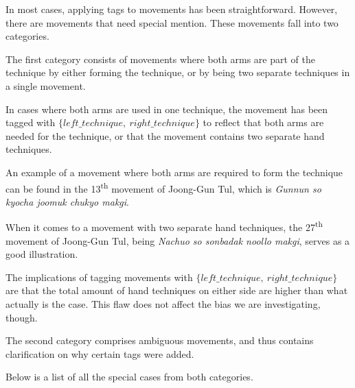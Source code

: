 \documentclass[10pt,twocolumn,a4paper]{article}
\begin{document}
  In most cases, applying tags to movements has been straightforward.
  However, there are movements that need special mention. These movements fall
  into two categories.

  The first category consists of movements where both arms are part of the
  technique by either forming the technique, or by being two separate
  techniques in a single movement.

  In cases where both arms are used in one technique, the movement has been
  tagged with $\{left\_technique, \: right\_technique\}$ to reflect that both
  arms are needed for the technique, or that the movement contains two
  separate hand techniques.

  An example of a movement where both arms are required to form the technique
  can be found in the 13\textsuperscript{th} movement of Joong-Gun Tul, which
  is \emph{Gunnun so kyocha joomuk chukyo makgi}.

  When it comes to a movement with two separate hand techniques, the
  27\textsuperscript{th} movement of Joong-Gun Tul, being \emph{Nachuo so
  sonbadak noollo makgi}, serves as a good illustration.

  The implications of tagging movements with $\{left\_technique, \:
  right\_technique\}$ are that the total amount of hand techniques on either
  side are higher than what actually is the case. This flaw does not affect
  the bias we are investigating, though.

  The second category comprises ambiguous movements, and thus contains
  clarification on why certain tags were added.

  Below is a list of all the special cases from both categories.
\end{document}
